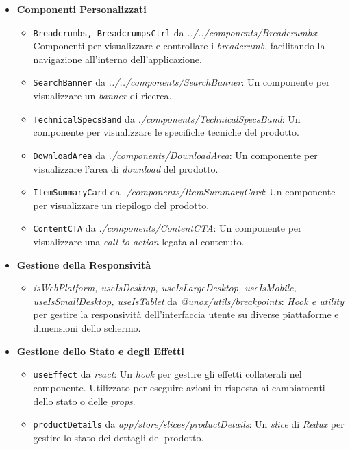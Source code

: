 \begin{itemize}
    \item \textbf{Componenti Personalizzati}
    \begin{itemize}
        \item \texttt{Breadcrumbs, BreadcrumpsCtrl} da \textit{../../components/Breadcrumbs}: Componenti per visualizzare e controllare i \textit{breadcrumb}, facilitando la navigazione all'interno dell'applicazione.
        \item \texttt{SearchBanner} da \textit{../../components/SearchBanner}: Un componente per visualizzare un \textit{banner} di ricerca.
        \item \texttt{TechnicalSpecsBand} da \textit{./components/TechnicalSpecsBand}: Un componente per visualizzare le specifiche tecniche del prodotto.
        \item \texttt{DownloadArea} da \textit{./components/DownloadArea}: Un componente per visualizzare l'area di \textit{download} del prodotto.
        \item \texttt{ItemSummaryCard} da \textit{./components/ItemSummaryCard}: Un componente per visualizzare un riepilogo del prodotto.
        \item \texttt{ContentCTA} da \textit{./components/ContentCTA}: Un componente per visualizzare una \textit{call-to-action} legata al contenuto.
    \end{itemize}

    \item \textbf{Gestione della Responsività}
    \begin{itemize}
        \item \textit{isWebPlatform, useIsDesktop, useIsLargeDesktop, useIsMobile, useIsSmallDesktop, useIsTablet} da \textit{@unox/utils/breakpoints}: \textit{Hook e utility} per gestire la responsività dell'interfaccia utente su diverse piattaforme e dimensioni dello schermo.
    \end{itemize}

    \item \textbf{Gestione dello Stato e degli Effetti}
    \begin{itemize}
        \item \texttt{useEffect} da \textit{react}: Un \textit{hook} per gestire gli effetti collaterali nel componente. Utilizzato per eseguire azioni in risposta ai cambiamenti dello stato o delle \textit{props}.
        \item \texttt{productDetails} da \textit{app/store/slices/productDetails}: Un \textit{slice} di \textit{Redux} per gestire lo stato dei dettagli del prodotto.
    \end{itemize}
\end{itemize}

